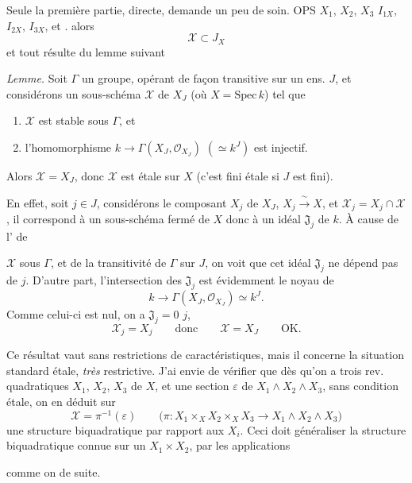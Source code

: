\documentclass[11pt,a4paper]{article}
\begin{document}
 Seule la première partie, directe, demande un peu de soin. OPS $X_1$, $X_2$, $X_3$ \ill{} $I_{1X}$, $I_{2X}$, $I_{3X}$, et    . \struck{\ill{}}  alors
\[
  \mathcal{X} \subset J_X
\]
et tout résulte du lemme suivant

\emph{Lemme.} Soit $\Gamma$ un groupe, opérant de façon transitive sur un ens. $J$, et considérons un sous-schéma  $\mathcal{X}$ de $X_J$ (où $X = \mathrm{Spec}\, k$) tel que
\begin{enumerate}
  \item[a)] $\mathcal{X}$ est stable sous $\Gamma$, et
  \item[b)] l'homomorphisme $k \to \Gamma(X_J, \mathcal{O}_{X_J})$ $(\simeq k^J)$ est injectif.
\end{enumerate}
Alors $\mathcal{X} = X_J$, donc $\mathcal{X}$ est étale sur $X$ (c'est fini étale si $J$ est fini).

En effet, soit $j \in J$, considérons le composant $X_j$ de $X_J$, $X_j \xrightarrow{\ \sim\ } X$, et $\mathcal{X}_j = X_j \cap \mathcal{X}$, il correspond à un sous-schéma fermé de $X$ donc à un idéal $\mathfrak{J}_j$ de $k$. À cause de l' de

$\mathcal{X}$ sous $\Gamma$, et de la transitivité de $\Gamma$ sur $J$, on voit que cet idéal $\mathfrak{J}_j$ ne dépend pas de $j$. D'autre part, l'intersection des $\mathfrak{J}_j$ est évidemment le noyau de
\[
  k \to \Gamma(X_J, \mathcal{O}_{X_J}) \simeq k^J .
\]
Comme celui-ci est nul, on a $\mathfrak{J}_j = 0$  $j$, 
\[
  \mathcal{X}_j = X_j \qquad \text{donc} \qquad \mathcal{X} = X_J \qquad \text{OK.}
\]

Ce résultat vaut sans restrictions de caractéristiques, mais il concerne la situation standard étale, \emph{très} restrictive. J'ai envie de vérifier que dès qu'on a trois rev. quadratiques $X_1$, $X_2$, $X_3$ de $X$, et une section $\varepsilon$ de $X_1 \wedge X_2 \wedge X_3$, sans condition étale, on en déduit sur
\[
  \mathcal{X} = \pi^{-1}(\varepsilon) \qquad
  \bigl(\pi : X_1 \times_X X_2 \times_X X_3 \to X_1 \wedge X_2 \wedge X_3\bigr)
\]
une structure biquadratique par rapport aux $X_i$. Ceci doit généraliser la structure biquadratique connue sur un $X_1 \times X_2$, par les applications


comme on  de suite.
\end{document}
